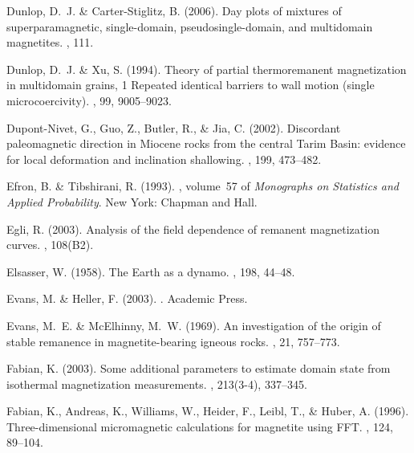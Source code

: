 \documentclass[11pt]{book}
\begin{document}
\begin{thebibliography}{}
Dunlop, D.~J. \& Carter-Stiglitz, B. (2006).
\newblock Day plots of mixtures of superparamagnetic, single-domain,
  pseudosingle-domain, and multidomain magnetites.
, 111.

Dunlop, D.~J. \& Xu, S. (1994).
\newblock Theory of partial thermoremanent magnetization in multidomain grains,
  1 Repeated identical barriers to wall motion (single microcoercivity).
, 99, 9005--9023.

Dupont-Nivet, G., Guo, Z., Butler, R., \& Jia, C. (2002).
\newblock Discordant paleomagnetic direction in Miocene rocks from the central
  Tarim Basin: evidence for local deformation and inclination shallowing.
, 199, 473--482.

Efron, B. \& Tibshirani, R. (1993).
, volume~57 of {\em Monographs
  on Statistics and Applied Probability}.
\newblock New York: Chapman and Hall.

Egli, R. (2003).
\newblock Analysis of the field dependence of remanent magnetization curves.
, 108(B2).

Elsasser, W. (1958).
\newblock The Earth as a dynamo.
, 198, 44--48.

Evans, M. \& Heller, F. (2003).
.
\newblock Academic Press.

Evans, M.~E. \& McElhinny, M.~W. (1969).
\newblock An investigation of the origin of stable remanence in
  magnetite-bearing igneous rocks.
, 21, 757--773.

Fabian, K. (2003).
\newblock Some additional parameters to estimate domain state from isothermal
  magnetization measurements.
, 213(3-4), 337--345.

Fabian, K., Andreas, K., Williams, W., Heider, F., Leibl, T., \& Huber, A.
  (1996).
\newblock Three-dimensional micromagnetic calculations for magnetite using FFT.
, 124, 89--104.


\end{thebibliography}
\end{document}
